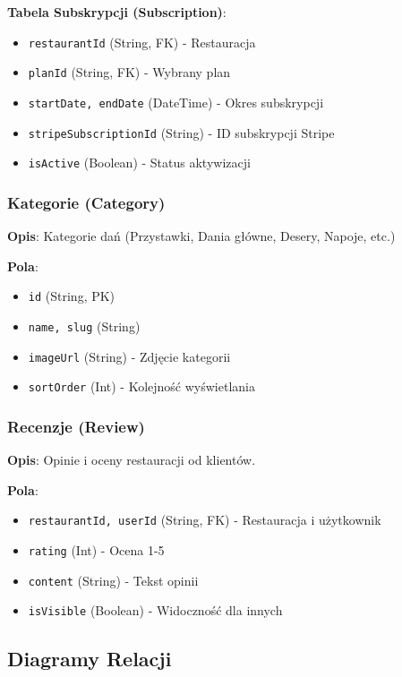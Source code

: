 \documentclass[12pt,a4paper,utf-8]{article}
\begin{document}
\textbf{Tabela Subskrypcji (Subscription)}:
\begin{itemize}
    \item \texttt{restaurantId} (String, FK) - Restauracja
    \item \texttt{planId} (String, FK) - Wybrany plan
    \item \texttt{startDate, endDate} (DateTime) - Okres subskrypcji
    \item \texttt{stripeSubscriptionId} (String) - ID subskrypcji Stripe
    \item \texttt{isActive} (Boolean) - Status aktywizacji
\end{itemize}

\subsubsection{Kategorie (Category)}

\textbf{Opis}: Kategorie dań (Przystawki, Dania główne, Desery, Napoje, etc.)

\textbf{Pola}:
\begin{itemize}
    \item \texttt{id} (String, PK)
    \item \texttt{name, slug} (String)
    \item \texttt{imageUrl} (String) - Zdjęcie kategorii
    \item \texttt{sortOrder} (Int) - Kolejność wyświetlania
\end{itemize}

\subsubsection{Recenzje (Review)}

\textbf{Opis}: Opinie i oceny restauracji od klientów.

\textbf{Pola}:
\begin{itemize}
    \item \texttt{restaurantId, userId} (String, FK) - Restauracja i użytkownik
    \item \texttt{rating} (Int) - Ocena 1-5
    \item \texttt{content} (String) - Tekst opinii
    \item \texttt{isVisible} (Boolean) - Widoczność dla innych
\end{itemize}

\subsection{Diagramy Relacji}
\end{document}
